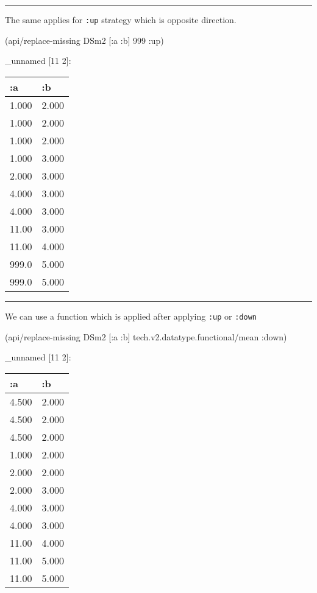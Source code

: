 \documentclass[]{article}
\newenvironment{Shaded}{\begin{snugshade}}{\end{snugshade}}
\newcommand{\DecValTok}[1]{\textcolor[rgb]{0.00,0.00,0.81}{#1}}
\newcommand{\AttributeTok}[1]{\textcolor[rgb]{0.77,0.63,0.00}{#1}}
\newcommand{\NormalTok}[1]{#1}
\begin{document}
\begin{center}\rule{0.5\linewidth}{0.5pt}\end{center}

The same applies for \texttt{:up} strategy which is opposite direction.

\begin{Shaded}
\begin{Highlighting}[]
\NormalTok{(api/replace-missing DSm2 [}\AttributeTok{:a} \AttributeTok{:b}\NormalTok{] }\DecValTok{999} \AttributeTok{:up}\NormalTok{)}
\end{Highlighting}
\end{Shaded}

\_unnamed {[}11 2{]}:

\begin{longtable}[]{@{}ll@{}}
\toprule
:a & :b\tabularnewline
\midrule
\endhead
1.000 & 2.000\tabularnewline
1.000 & 2.000\tabularnewline
1.000 & 2.000\tabularnewline
1.000 & 3.000\tabularnewline
2.000 & 3.000\tabularnewline
4.000 & 3.000\tabularnewline
4.000 & 3.000\tabularnewline
11.00 & 3.000\tabularnewline
11.00 & 4.000\tabularnewline
999.0 & 5.000\tabularnewline
999.0 & 5.000\tabularnewline
\bottomrule
\end{longtable}

\begin{center}\rule{0.5\linewidth}{0.5pt}\end{center}

We can use a function which is applied after applying \texttt{:up} or
\texttt{:down}

\begin{Shaded}
\begin{Highlighting}[]
\NormalTok{(api/replace-missing DSm2 [}\AttributeTok{:a} \AttributeTok{:b}\NormalTok{] tech.v2.datatype.functional/mean }\AttributeTok{:down}\NormalTok{)}
\end{Highlighting}
\end{Shaded}

\_unnamed {[}11 2{]}:

\begin{longtable}[]{@{}ll@{}}
\toprule
:a & :b\tabularnewline
\midrule
\endhead
4.500 & 2.000\tabularnewline
4.500 & 2.000\tabularnewline
4.500 & 2.000\tabularnewline
1.000 & 2.000\tabularnewline
2.000 & 2.000\tabularnewline
2.000 & 3.000\tabularnewline
4.000 & 3.000\tabularnewline
4.000 & 3.000\tabularnewline
11.00 & 4.000\tabularnewline
11.00 & 5.000\tabularnewline
11.00 & 5.000\tabularnewline
\bottomrule
\end{longtable}
\end{document}
